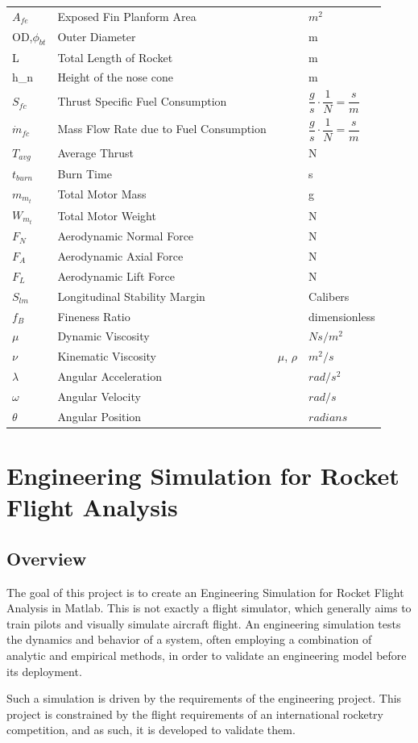 \documentclass[]{book}
\begin{document}
\begin{longtable}[c]{@{}llll@{}}
\(A_{fe}\) & Exposed Fin Planform Area & & \(m^2\)\tabularnewline
OD,\(\phi_{bt}\) & Outer Diameter & & m\tabularnewline
L & Total Length of Rocket & & m\tabularnewline
h\_n & Height of the nose cone & & m\tabularnewline
\(S_{fc}\) & Thrust Specific Fuel Consumption & &
\(\dfrac{g}{s}\cdot \dfrac{1}{N} = \dfrac{s}{m}\)\tabularnewline
\(\dot{m}_{fc}\) & Mass Flow Rate due to Fuel Consumption & &
\(\dfrac{g}{s}\cdot \dfrac{1}{N} = \dfrac{s}{m}\)\tabularnewline
\(T_{avg}\) & Average Thrust & & N\tabularnewline
\(t_{burn}\) & Burn Time & & s\tabularnewline
\(m_{m_t}\) & Total Motor Mass & & g\tabularnewline
\(W_{m_t}\) & Total Motor Weight & & N\tabularnewline
\(F_N\) & Aerodynamic Normal Force & & N\tabularnewline
\(F_A\) & Aerodynamic Axial Force & & N\tabularnewline
\(F_L\) & Aerodynamic Lift Force & & N\tabularnewline
\(S_{lm}\) & Longitudinal Stability Margin & & Calibers\tabularnewline
\(f_B\) & Fineness Ratio & & dimensionless\tabularnewline
\(\mu\) & Dynamic Viscosity & & \(N s / m^2\)\tabularnewline
\(\nu\) & Kinematic Viscosity & \(\mu\), \(\rho\) &
\(m^2/s\)\tabularnewline
\(\lambda\) & Angular Acceleration & & \(rad/s^2\)\tabularnewline
\(\omega\) & Angular Velocity & & \(rad/s\)\tabularnewline
\(\theta\) & Angular Position & & \(radians\)\tabularnewline
\bottomrule
\end{longtable}


\clearpage

\mainmatter

\chapter{Engineering Simulation for Rocket Flight
Analysis}\label{engineering-simulation-for-rocket-flight-analysis}

\section{Overview}\label{overview}

The goal of this project is to create an Engineering Simulation for
Rocket Flight Analysis in Matlab. This is not exactly a flight
simulator, which generally aims to train pilots and visually simulate
aircraft flight. An engineering simulation tests the dynamics and
behavior of a system, often employing a combination of analytic and
empirical methods, in order to validate an engineering model before its
deployment.

Such a simulation is driven by the requirements of the engineering
project. This project is constrained by the flight requirements of an
international rocketry competition, and as such, it is developed to
validate them.
\end{document}
